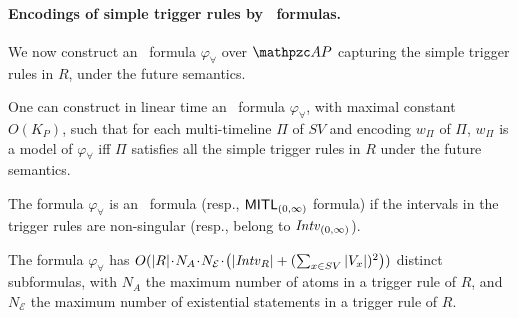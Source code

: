  \paragraph{Encodings of simple trigger rules by \MTL\ formulas.} 
 We now construct an \MTL\ formula $\varphi_{\forall}$ over $\Prop$ capturing the simple trigger rules in $R$, 
  under the future semantics.

 \begin{proposition}\label{prop:MTLTriggerRules} One can construct in linear time an \MTL\ formula $\varphi_{\forall}$, with maximal constant $O(K_P)$,
  such that for each multi-timeline $\Pi$ of $SV$ and encoding $w_\Pi$ of $\Pi$, $w_\Pi$ is a model of $\varphi_\forall$
  iff $\Pi$ satisfies all the simple trigger rules in $R$ under the future semantics. 
  
  
  The formula $\varphi_\forall$ is an \MITL\ formula (resp., $\text{\sffamily MITL}_{(0,\infty)}$ formula) if the intervals in the trigger rules are non-singular (resp., belong to ${\mathit{Intv}_{(0,\infty)}}$). 
  
  The formula $\varphi_\forall$ has $O(|R|\!\cdot\! N_A \!\cdot\! N_{\mathcal{E}}\!\cdot\! \left(|{\mathit{Intv}}_R| + (\sum_{x\in SV}|V_x|)^2\right))$ distinct subformulas, with $N_A$ the maximum number of atoms in a trigger rule of $R$, and $N_{\mathcal{E}}$ the maximum number of existential statements in a trigger rule of $R$.
 \end{proposition}
